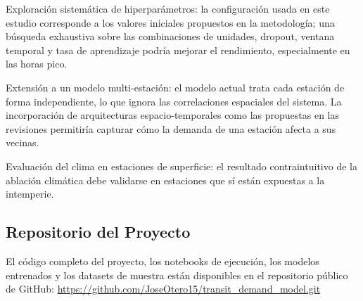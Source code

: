 \documentclass[preprint,12pt]{elsarticle}
\begin{document}
Exploración sistemática de hiperparámetros: la configuración usada en este estudio corresponde a los valores iniciales propuestos en la metodología; una búsqueda exhaustiva sobre las combinaciones de unidades, dropout, ventana temporal y tasa de aprendizaje podría mejorar el rendimiento, especialmente en las horas pico.

Extensión a un modelo multi-estación: el modelo actual trata cada estación de forma independiente, lo que ignora las correlaciones espaciales del sistema. La incorporación de arquitecturas espacio-temporales como las propuestas en las revisiones permitiría capturar cómo la demanda de una estación afecta a sus vecinas.

Evaluación del clima en estaciones de superficie: el resultado contraintuitivo de la ablación climática debe validarse en estaciones que sí están expuestas a la intemperie.


\subsection{Repositorio del Proyecto}

El código completo del proyecto, los notebooks de ejecución, los modelos entrenados y los datasets de muestra están disponibles en el repositorio público de GitHub: \url{https://github.com/JoseOtero15/transit_demand_model.git}



\end{document}
